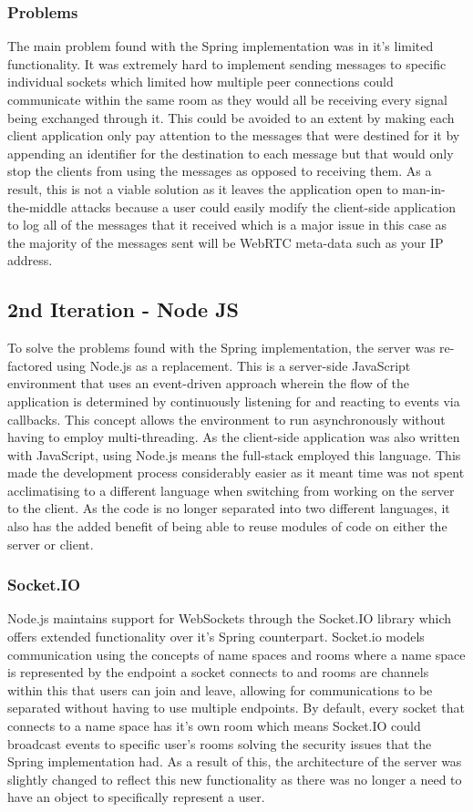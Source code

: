 \documentclass[]{report}
\begin{document}
				\subsubsection*{Problems}
				The main problem found with the Spring implementation was in it's limited functionality. It was extremely hard to implement sending messages to specific individual sockets which limited how multiple peer connections could communicate within the same room as they would all be receiving every signal being exchanged through it. This could be avoided to an extent by making each client application only pay attention to the messages that were destined for it by appending an identifier for the destination to each message but that would only stop the clients from using the messages as opposed to receiving them. As a result, this is not a viable solution as it leaves the application open to man-in- the-middle attacks because a user could easily modify the client-side application to log all of the messages that it received which is a major issue in this case as the majority of the messages sent will be WebRTC meta-data such as your IP address.
				
			\subsection{2nd Iteration - Node JS}
			To solve the problems found with the Spring implementation, the server was re-factored using Node.js as a replacement. This is a server-side JavaScript environment that uses an event-driven approach wherein the flow of the application is determined by continuously listening for and reacting to events via callbacks. This concept allows the environment to run asynchronously without having to employ multi-threading. As the client-side application was also written with JavaScript, using Node.js means the full-stack employed this language. This made the development process considerably easier as it meant time was not spent acclimatising to a different language when switching from working on the server to the client. As the code is no longer separated into two different languages, it also has the added benefit of being able to reuse modules of code on either the server or client.
				\subsubsection*{Socket.IO}
				Node.js maintains support for WebSockets through the Socket.IO library which offers extended functionality over it's Spring counterpart. Socket.io models communication using the concepts of name spaces and rooms where a name space is represented by the endpoint a socket connects to and rooms are channels within this that users can join and leave, allowing for communications to be separated without having to use multiple endpoints. By default, every socket that connects to a name space has it's own room which means Socket.IO could broadcast events to specific user's rooms solving the security issues that the Spring implementation had. As a result of this, the architecture of the server was slightly changed to reflect this new functionality as there was no longer a need to have an object to specifically represent a user. 
				
\end{document}
